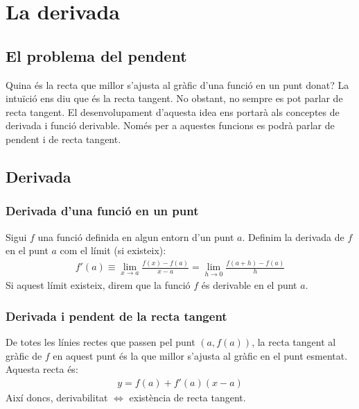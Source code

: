 \section{La derivada}
\subsection{El problema del pendent}
Quina és la recta que millor s'ajusta al gràfic d'una funció en un punt donat? La intuïció ens diu que és la recta tangent. No obstant, no sempre es pot parlar de recta tangent. El desenvolupament d'aquesta idea ens portarà als conceptes de derivada i funció derivable. Només per a aquestes funcions es podrà parlar de pendent i de recta tangent.

\subsection{Derivada}
\subsubsection*{Derivada d'una funció en un punt}
Sigui $f$ una funció definida en algun entorn d'un punt $a$. Definim la derivada de $f$ en el punt $a$ com el límit (si existeix):
\begin{align}
    f'(a) \equiv \lim\limits_{x \to a} \frac{f(x)-f(a)}{x-a} = \lim\limits_{h \to 0} \frac{f(a+h) - f(a)}{h}
\end{align}    
Si aquest límit existeix, direm que la funció $f$ és derivable en el punt $a$.

\subsubsection*{Derivada i pendent de la recta tangent}
De totes les línies rectes que passen pel punt $(a, f(a))$, la recta tangent al gràfic de $f$ en aquest punt és la que millor s'ajusta al gràfic en el punt esmentat. Aquesta recta és:
\begin{align}
    y = f(a) + f'(a)(x-a)
\end{align}
Així doncs, derivabilitat $\Leftrightarrow$ existència de recta tangent.
